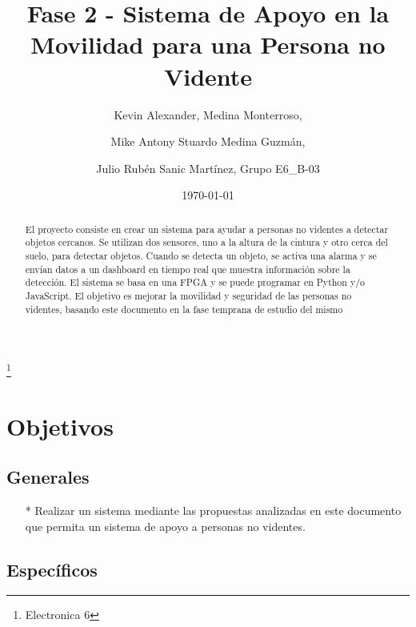 \documentclass[osajnl,twocolumn,showpacs,superscriptaddress,10pt]{revtex4-1}
\begin{document}
\title{Fase 2 -  Sistema de Apoyo en la
Movilidad para una Persona no Vidente}
\thanks{Electronica 6}

\author{Kevin Alexander, Medina Monterroso,}
\author{Mike Antony Stuardo Medina Guzmán, }
\author{Julio Rubén Sanic Martínez, Grupo E6_{B-03} }


%


\date{\today}%

\maketitle{}
\begin{abstract}
El proyecto consiste en crear un sistema para ayudar a personas no videntes a detectar objetos cercanos. Se utilizan dos sensores, uno a la altura de la cintura y otro cerca del suelo, para detectar objetos. Cuando se detecta un objeto, se activa una alarma y se envían datos a un dashboard en tiempo real que muestra información sobre la detección. El sistema se basa en una FPGA y se puede programar en Python y/o JavaScript. El objetivo es mejorar la movilidad y seguridad de las personas no videntes, basando este documento en la fase temprana de estudio del mismo
\end{abstract}


\section{Objetivos}

\subsection{Generales}

\begin{itemize}
\item[*] Realizar un sistema mediante las propuestas analizadas en este documento que permita un sistema de apoyo a personas no videntes.
\end{itemize}

\subsection{Específicos}
\end{document}
